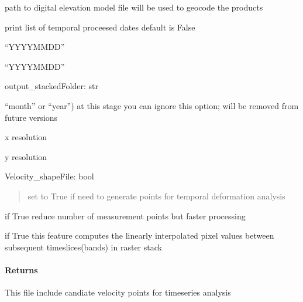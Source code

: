 \documentclass[letterpaper,10pt,english]{sphinxmanual}
\begin{document}
\begin{fulllineitems}
\begin{description}
\sphinxAtStartPar
path to digital elevation model file will be used to geocode the products

\sphinxAtStartPar
print list of temporal proceesed dates default is False

\sphinxAtStartPar
“YYYYMMDD”

\sphinxAtStartPar
“YYYYMMDD”

\end{description}

\sphinxAtStartPar
output\_stackedFolder: str
\begin{description}
\sphinxAtStartPar
“month” or “year”) at this stage you can ignore this option; will be removed from future versions

\sphinxAtStartPar
x resolution

\sphinxAtStartPar
y resolution

\end{description}

\sphinxAtStartPar
Velocity\_shapeFile: bool
\begin{quote}

\sphinxAtStartPar
set to True if need to generate points for temporal deformation analysis
\end{quote}
\begin{description}
\sphinxAtStartPar
if True reduce number of measurement points but faster processing

\sphinxAtStartPar
if True this feature computes the linearly interpolated pixel values between subsequent time\sphinxhyphen{}slices(bands) in raster stack

\end{description}


\paragraph{Returns}
\label{\detokenize{akhdefo_functions:id38}}\begin{description}
\sphinxAtStartPar
This file include candiate velocity points for timeseries analysis

\end{description}

\end{fulllineitems}
\end{document}
